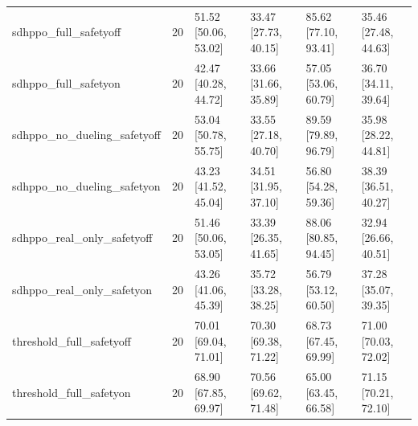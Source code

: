 \begin{table}[t]
\begin{tabular}{lrllll}
sdhppo\_full\_safetyoff & 20 & 51.52 [50.06, 53.02] & 33.47 [27.73, 40.15] & 85.62 [77.10, 93.41] & 35.46 [27.48, 44.63] \\
sdhppo\_full\_safetyon & 20 & 42.47 [40.28, 44.72] & 33.66 [31.66, 35.89] & 57.05 [53.06, 60.79] & 36.70 [34.11, 39.64] \\
sdhppo\_no\_dueling\_safetyoff & 20 & 53.04 [50.78, 55.75] & 33.55 [27.18, 40.70] & 89.59 [79.89, 96.79] & 35.98 [28.22, 44.81] \\
sdhppo\_no\_dueling\_safetyon & 20 & 43.23 [41.52, 45.04] & 34.51 [31.95, 37.10] & 56.80 [54.28, 59.36] & 38.39 [36.51, 40.27] \\
sdhppo\_real\_only\_safetyoff & 20 & 51.46 [50.06, 53.05] & 33.39 [26.35, 41.65] & 88.06 [80.85, 94.45] & 32.94 [26.66, 40.51] \\
sdhppo\_real\_only\_safetyon & 20 & 43.26 [41.06, 45.39] & 35.72 [33.28, 38.25] & 56.79 [53.12, 60.50] & 37.28 [35.07, 39.35] \\
threshold\_full\_safetyoff & 20 & 70.01 [69.04, 71.01] & 70.30 [69.38, 71.22] & 68.73 [67.45, 69.99] & 71.00 [70.03, 72.02] \\
threshold\_full\_safetyon & 20 & 68.90 [67.85, 69.97] & 70.56 [69.62, 71.48] & 65.00 [63.45, 66.58] & 71.15 [70.21, 72.10] \\
\bottomrule
\end{tabular}
\end{table}